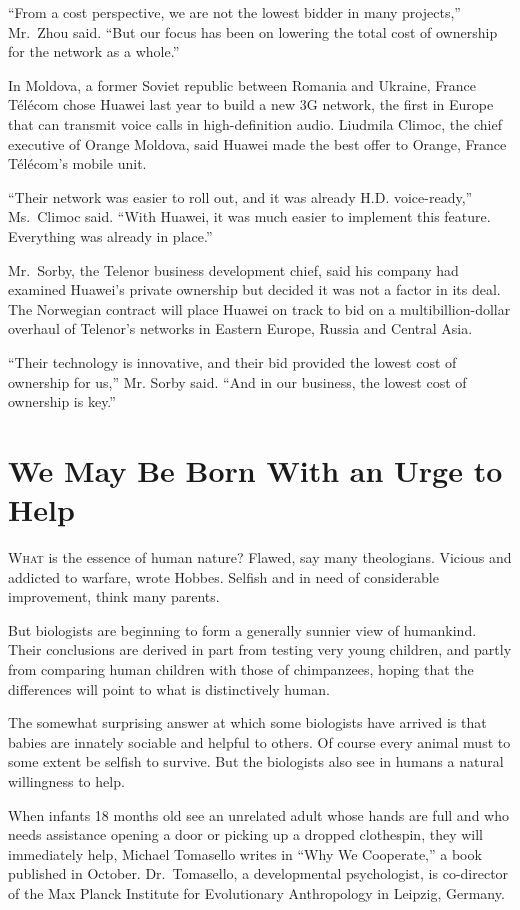 ﻿\documentclass[12pt]{article}
\begin{document}
``From a cost perspective, we are not the lowest bidder in many projects,'' Mr.~Zhou said. ``But our
focus has been on lowering the total cost of ownership for the network as a whole.''

In Moldova, a former Soviet republic between Romania and Ukraine, France T\'el\'ecom chose Huawei
last year to build a new 3G network, the first in Europe that can transmit voice calls in
high-definition audio. Liudmila Climoc, the chief executive of Orange Moldova, said Huawei made the
best offer to Orange, France T\'el\'ecom's mobile unit.

``Their network was easier to roll out, and it was already H.D. voice-ready,'' Ms.~Climoc said.
``With Huawei, it was much easier to implement this feature. Everything was already in place.''

Mr.~Sorby, the Telenor business development chief, said his company had examined Huawei's private
ownership but decided it was not a factor in its deal. The Norwegian contract will place Huawei on
track to bid on a multibillion-dollar overhaul of Telenor's networks in Eastern Europe, Russia and
Central Asia.

``Their technology is innovative, and their bid provided the lowest cost of ownership for us,'' Mr.
Sorby said. ``And in our business, the lowest cost of ownership is key.''

\section{We May Be Born With an Urge to Help}

\lettrine{W}{hat} is the essence of human nature? Flawed, say many
theologians. Vicious and addicted to warfare, wrote Hobbes. Selfish and in need of considerable
improvement, think many parents.

But biologists are beginning to form a generally sunnier view of humankind. Their conclusions are
derived in part from testing very young children, and partly from comparing human children with
those of chimpanzees, hoping that the differences will point to what is distinctively human.

The somewhat surprising answer at which some biologists have arrived is that babies are innately
sociable and helpful to others. Of course every animal must to some extent be selfish to survive.
But the biologists also see in humans a natural willingness to help.

When infants 18 months old see an unrelated adult whose hands are full and who needs assistance
opening a door or picking up a dropped clothespin, they will immediately help, Michael Tomasello
writes in ``Why We Cooperate,'' a book published in October. Dr.~Tomasello, a developmental
psychologist, is co-director of the Max Planck Institute for Evolutionary Anthropology in Leipzig,
Germany.
\end{document}
